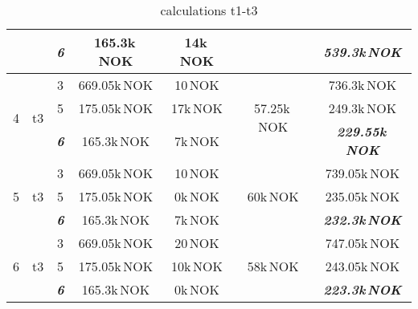 \documentclass{article}
\begin{document}
\begin{table}[hbt!]
\begin{center}
\begin{tabular}[h]{|c|c|c||c|c|c||c|}
&	&	\textit{\textbf{6}}		&		165.3k\,NOK		&	14k\,NOK		&					&	\textit{\textbf{539.3k\,NOK}}\\
\hline
\multirow{3}{*}{4} & \multirow{3}{*}{t3}	
	&	3		&		669.05k\,NOK	&	10\,NOK			&	\multirow{3}{*}{57.25k\,NOK}		&	736.3k\,NOK\\
&	&	5		&		175.05k\,NOK	&	17k\,NOK		&										&	249.3k\,NOK\\
&	&	\textit{\textbf{6}}		&		165.3k\,NOK		&	7k\,NOK			&					&	\textit{\textbf{229.55k\,NOK}}\\
\hline
\multirow{3}{*}{5} & \multirow{3}{*}{t3}	
	&	3		&		669.05k\,NOK	&	10\,NOK			&	\multirow{3}{*}{60k\,NOK}			&	739.05k\,NOK\\
&	&	5		&		175.05k\,NOK	&	0k\,NOK			&										&	235.05k\,NOK\\
&	&	\textit{\textbf{6}}		&		165.3k\,NOK		&	7k\,NOK			&					&	\textit{\textbf{232.3k\,NOK}}\\
\hline
\multirow{3}{*}{6} & \multirow{3}{*}{t3}	
	&	3		&		669.05k\,NOK	&	20\,NOK			&	\multirow{3}{*}{58k\,NOK}			&	747.05k\,NOK\\
&	&	5		&		175.05k\,NOK	&	10k\,NOK		&										&	243.05k\,NOK\\
&	&	\textit{\textbf{6}}		&		165.3k\,NOK		&	0k\,NOK			&					&	\textit{\textbf{223.3k\,NOK}}\\
\hline
\end{tabular}
\caption{calculations t1-t3}\label{tab:calct13}
\end{center}
\end{table}
\end{document}
